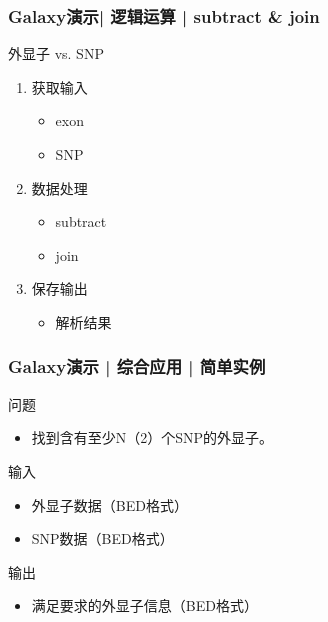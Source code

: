 \begin{frame}
  \frametitle{Galaxy演示| 逻辑运算 | subtract \& join}
  \begin{block}{外显子 vs. SNP}
    \pause
  \begin{enumerate}[<+-|alert@+>]
    \item 获取输入
      \begin{itemize}
        \item exon
        \item SNP
      \end{itemize}
    \item 数据处理
      \begin{itemize}
        \item subtract
        \item join
      \end{itemize}
    \item 保存输出
      \begin{itemize}
        \item 解析结果
      \end{itemize}
  \end{enumerate}
\end{block}
\end{frame}

\begin{frame}
  \frametitle{Galaxy演示 | 综合应用 | 简单实例}
  \begin{block}{问题}
    \begin{itemize}
      \item 找到含有至少N（2）个SNP的外显子。
    \end{itemize}
  \end{block}
  \pause
  \begin{block}{输入}
    \begin{itemize}
      \item 外显子数据（BED格式）
      \item SNP数据（BED格式）
    \end{itemize}
  \end{block}
  \pause
  \begin{block}{输出}
    \begin{itemize}
      \item 满足要求的外显子信息（BED格式）
    \end{itemize}
  \end{block}
\end{frame}

